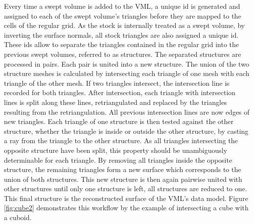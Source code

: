 Every time a swept volume is added to the VML, a unique id is generated and assigned to each of the swept volume's triangles before they are mapped to the cells of the regular grid.
As the stock is internally treated as a swept volume, by inverting the surface normals, all stock triangles are also assigned a unique id.
These ids allow to separate the triangles contained in the regular grid into the previous swept volumes, referred to as structures.
The separated structures are processed in pairs.
Each pair is united into a new structure.
The union of the two structure meshes is calculated by intersecting each triangle of one mesh with each triangle of the other mesh.
If two triangles intersect, the intersection line is recorded for both triangles.
After intersection, each triangle with intersection lines is split along these lines, retriangulated and replaced by the triangles resulting from the retriangulation.
All previous intersection lines are now edges of new triangles.
Each triangle of one structure is then tested against the other structure, whether the triangle is inside or outside the other structure, \eg by casting a ray from the triangle to the other structure.
As all triangles intersecting the opposite structure have been split, this property should be unambiguously determinable for each triangle.
By removing all triangles inside the opposite structure, the remaining triangles form a new surface which corresponds to the union of both structures.
This new structure is then again pairwise united with other structures until only one structure is left, \ie all structures are reduced to one.
This final structure is the reconstructed surface of the VML's data model.
Figure \ref{fig:cube2} demonstrates this workflow by the example of intersecting a cube with a cuboid.

